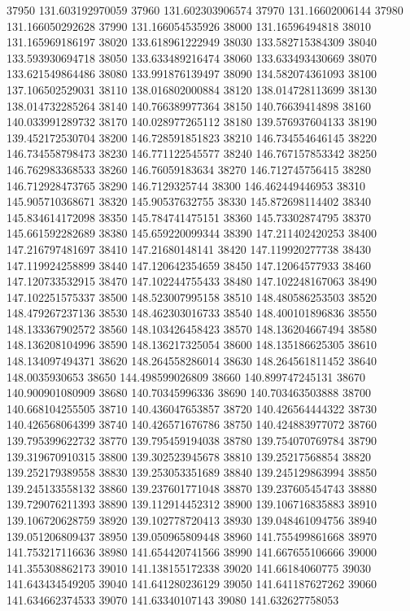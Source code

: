 {37950 131.603192970059
37960 131.602303906574
37970 131.16602006144
37980 131.166050292628
37990 131.166054535926
38000 131.16596494818
38010 131.165969186197
38020 133.618961222949
38030 133.582715384309
38040 133.593930694718
38050 133.633489216474
38060 133.633493430669
38070 133.621549864486
38080 133.991876139497
38090 134.582074361093
38100 137.106502529031
38110 138.016802000884
38120 138.014728113699
38130 138.014732285264
38140 140.766389977364
38150 140.76639414898
38160 140.033991289732
38170 140.028977265112
38180 139.576937604133
38190 139.452172530704
38200 146.728591851823
38210 146.734554646145
38220 146.734558798473
38230 146.771122545577
38240 146.767157853342
38250 146.762983368533
38260 146.76059183634
38270 146.712745756415
38280 146.712928473765
38290 146.7129325744
38300 146.462449446953
38310 145.905710368671
38320 145.90537632755
38330 145.872698114402
38340 145.834614172098
38350 145.784741475151
38360 145.73302874795
38370 145.661592282689
38380 145.659220099344
38390 147.211402420253
38400 147.216797481697
38410 147.21680148141
38420 147.119920277738
38430 147.119924258899
38440 147.120642354659
38450 147.12064577933
38460 147.120733532915
38470 147.102244755433
38480 147.102248167063
38490 147.102251575337
38500 148.523007995158
38510 148.480586253503
38520 148.479267237136
38530 148.462303016733
38540 148.400101896836
38550 148.133367902572
38560 148.103426458423
38570 148.136204667494
38580 148.136208104996
38590 148.136217325054
38600 148.135186625305
38610 148.134097494371
38620 148.264558286014
38630 148.264561811452
38640 148.0035930653
38650 144.498599026809
38660 140.899747245131
38670 140.900901080909
38680 140.70345996336
38690 140.703463503888
38700 140.668104255505
38710 140.436047653857
38720 140.426564444322
38730 140.426568064399
38740 140.426571676786
38750 140.424883977072
38760 139.795399622732
38770 139.795459194038
38780 139.754070769784
38790 139.319670910315
38800 139.302523945678
38810 139.25217568854
38820 139.252179389558
38830 139.253053351689
38840 139.245129863994
38850 139.245133558132
38860 139.237601771048
38870 139.237605454743
38880 139.729076211393
38890 139.112914452312
38900 139.106716835883
38910 139.106720628759
38920 139.102778720413
38930 139.048461094756
38940 139.051206809437
38950 139.050965809448
38960 141.755499861668
38970 141.753217116636
38980 141.654420741566
38990 141.667655106666
39000 141.355308862173
39010 141.138155172338
39020 141.66184060775
39030 141.643434549205
39040 141.641280236129
39050 141.641187627262
39060 141.634662374533
39070 141.63340107143
39080 141.632627758053
}
